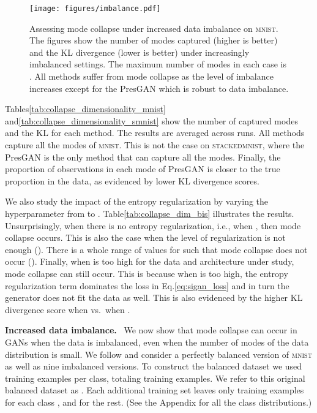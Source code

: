\documentclass[11pt]{article}
\DeclareRobustCommand{\parhead}[1]{\textbf{#1}~}
\begin{document}
\begin{figure*}[t]
	\centering
	\vspace*{-10pt}
	\centerline{\texttt{[image: figures/imbalance.pdf]}}
	\caption{Assessing mode collapse under increased data imbalance on \textsc{mnist}. The figures show the number of modes captured (higher is better) and the \gls{KL} divergence (lower is better) under increasingly imbalanced settings. The maximum number of modes in each case is . All methods suffer from mode collapse as the level of imbalance increases except for the Pres\gls{GAN} which is robust to data imbalance.}
	\label{fig:imbalance}
	\vspace*{-8pt}
\end{figure*}

Tables\nobreakspace \ref {tab:collapse_dimensionality_mnist} and\nobreakspace  \ref {tab:collapse_dimensionality_smnist} show the number of captured modes and the \gls{KL} for each method. The results are averaged across  runs. All methods capture all the modes of \textsc{mnist}. This is not the case on \textsc{stackedmnist}, where the Pres\gls{GAN} is the only method that can capture all the modes. 
Finally, the proportion of observations in each mode of Pres\gls{GAN} is closer to the true proportion in the data, as evidenced by lower \acrshort{KL} divergence scores.

We also study the impact of the entropy regularization by varying the hyperparameter  from  to . Table\nobreakspace \ref {tab:collapse_dim_bis} illustrates the results. Unsurprisingly, when there is no entropy regularization, i.e., when , then mode collapse occurs. This is also the case when the level of regularization is not enough (). There is a whole range of values for  such that mode collapse does not occur (). Finally, when  is too high for the data and architecture under study, mode collapse can still occur. This is because when  is too high, the entropy regularization term dominates the loss in Eq.\nobreakspace \ref {eq:sigan_loss} and in turn the generator does not fit the data as well. This is also evidenced by the higher \gls{KL} divergence score when  vs.\ when .

\parhead{Increased data imbalance.} We now show that mode collapse can occur in \glspl{GAN} when the data is imbalanced, even when the number of modes of the data distribution is small. We follow \citet{dieng2018learning} and consider a perfectly balanced version of \textsc{mnist} as well as nine imbalanced versions. To construct the balanced dataset we used  training examples per class, totaling  training examples. We refer to this original balanced dataset as . Each additional training set  leaves only  training examples for each class , and  for the rest. (See the Appendix for all the class distributions.)
\end{document}
